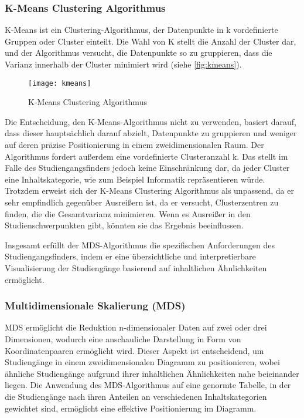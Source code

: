 \subsubsection{K-Means Clustering Algorithmus}
K-Means ist ein Clustering-Algorithmus, der Datenpunkte in k vordefinierte
Gruppen oder Cluster einteilt. Die Wahl von K stellt die Anzahl der Cluster dar,
und der Algorithmus versucht, die Datenpunkte so zu gruppieren, dass die Varianz
innerhalb der Cluster minimiert wird (siehe \autoref{fig:kmeans}).
\parencite{kmeans}

\begin{figure}[H]
    \centering
    \texttt{[image: kmeans]}
    \caption{K-Means Clustering Algorithmus}
    \label{fig:kmeans}
\end{figure}

Die Entscheidung, den K-Means-Algorithmus nicht zu verwenden, basiert darauf,
dass dieser hauptsächlich darauf abzielt, Datenpunkte zu gruppieren und weniger
auf deren präzise Positionierung in einem zweidimensionalen Raum. Der
Algorithmus fordert außerdem eine vordefinierte Clusteranzahl k. Das stellt im
Falle des Studiengangsfinders jedoch keine Einschränkung dar, da jeder Cluster
eine Inhaltskategorie, wie zum Beispiel \glqq Informatik\grqq{} repräsentieren
würde. Trotzdem erweist sich der K-Means Clustering Algorithmus als unpassend,
da er sehr empfindlich gegenüber Ausreißern ist, da er versucht, Clusterzentren
zu finden, die die Gesamtvarianz minimieren. Wenn es Ausreißer in den
Studienschwerpunkten gibt, könnten sie das Ergebnis beeinflussen.
\parencite{kmeans-spikes}

Insgesamt erfüllt der MDS-Algorithmus die spezifischen Anforderungen des
Studiengangsfinders, indem er eine übersichtliche und interpretierbare
Visualisierung der Studiengänge basierend auf inhaltlichen Ähnlichkeiten
ermöglicht.

\subsubsection{Multidimensionale Skalierung (MDS)}
MDS ermöglicht die Reduktion n-dimensionaler Daten auf zwei oder drei
Dimensionen, wodurch eine anschauliche Darstellung in Form von Koordinatenpaaren
ermöglicht wird. Dieser Aspekt ist entscheidend, um Studiengänge in einem
zweidimensionalen Diagramm zu positionieren, wobei ähnliche Studiengänge
aufgrund ihrer inhaltlichen Ähnlichkeiten nahe beieinander liegen. Die Anwendung
des MDS-Algorithmus auf eine genormte Tabelle, in der die Studiengänge nach
ihren Anteilen an verschiedenen Inhaltskategorien gewichtet sind, ermöglicht
eine effektive Positionierung im Diagramm.
